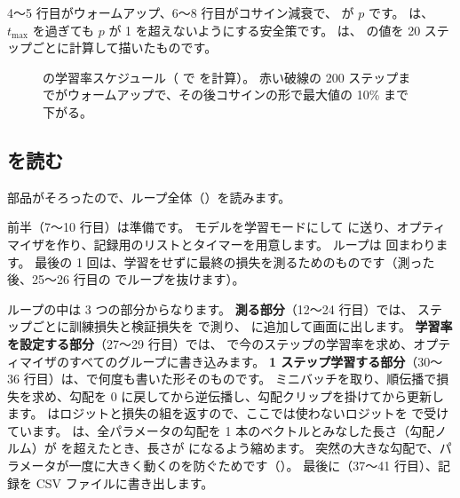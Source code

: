 
4〜5 行目がウォームアップ、6〜8 行目がコサイン減衰で、 が $p$ です。
 は、$t_{\max}$ を過ぎても $p$ が 1 を超えないようにする安全策です。
は、 の値を 20 ステップごとに計算して描いたものです。

\begin{figure}[tbp]
\centering
{}
\caption{ の学習率スケジュール（ で  を計算）。
赤い破線の 200 ステップまでがウォームアップで、その後コサインの形で最大値の 10\% まで下がる。}
\label{fig:pt-lr}
\end{figure}

\subsection{ を読む}

部品がそろったので、ループ全体（）を読みます。

前半（7〜10 行目）は準備です。
モデルを学習モードにして  に送り、オプティマイザを作り、記録用のリストとタイマーを用意します。
ループは  回まわります。
最後の 1 回は、学習をせずに最終の損失を測るためのものです（測った後、25〜26 行目の  でループを抜けます）。

ループの中は 3 つの部分からなります。
\textbf{測る部分}（12〜24 行目）では、 ステップごとに訓練損失と検証損失を  で測り、 に追加して画面に出します。
\textbf{学習率を設定する部分}（27〜29 行目）では、 で今のステップの学習率を求め、オプティマイザのすべてのグループに書き込みます。
\textbf{1 ステップ学習する部分}（30〜36 行目）は、で何度も書いた形そのものです。
ミニバッチを取り、順伝播で損失を求め、勾配を 0 に戻してから逆伝播し、勾配クリップを掛けてから更新します。
 はロジットと損失の組を返すので、ここでは使わないロジットを \code{_} で受けています。
 は、全パラメータの勾配を 1 本のベクトルとみなした長さ（勾配ノルム）が  を超えたとき、長さが  になるよう縮めます。
突然の大きな勾配で、パラメータが一度に大きく動くのを防ぐためです（）。
最後に（37〜41 行目）、記録を CSV ファイルに書き出します。

